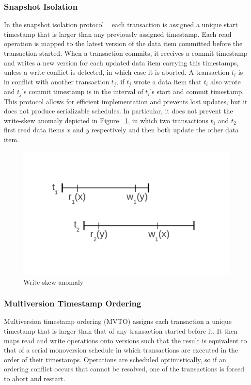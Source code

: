 \documentclass[10pt,final,journal]{IEEEtran}
\begin{document}
\subsubsection{Snapshot Isolation}
In the snapshot isolation protocol ~\cite{Berenson:1995:CAS:568271.223785} each transaction is assigned a unique start timestamp that is larger than any previously assigned timestamp. Each read operation is mapped to the latest version of the data item committed before the transaction started. When a transaction commits, it receives a commit timestamp and writes a new version for each updated data item carrying this timestamps, unless a write conflict is detected, in which case it is aborted. A transaction $t_i$ is in conflict with another transaction $t_j$, if $t_j$ wrote a data item that $t_i$ also wrote and $t_j$'s commit timestamp is in the interval of $t_i$'s start and commit timestamp. This protocol allows for efficient implementation and prevents lost updates, but it does not produce serializable schedules. In particular, it does not prevent the write-skew anomaly depicted in Figure ~\ref{si}, in which two transactions $t_1$ and $t_2$ first read data items $x$ and $y$ respectively and then both update the other data item.

\begin{figure}[!t]
\centering
\hspace*{-.2in}
\includegraphics{images/si.pdf}
\caption{Write skew anomaly}
\label{si}
\end{figure}

\subsubsection{Multiversion Timestamp Ordering}
Multiversion timestamp ordering (MVTO) assigns each transaction a unique timestamp that is larger than that of any transaction started before it. It then maps read and write operations onto versions such that the result is equivalent to that of a serial monoversion schedule in which transactions are executed in the order of their timestamps. Operations are scheduled optimistically, so if an ordering conflict occurs that cannot be resolved, one of the transactions is forced to abort and restart.
\end{document}

